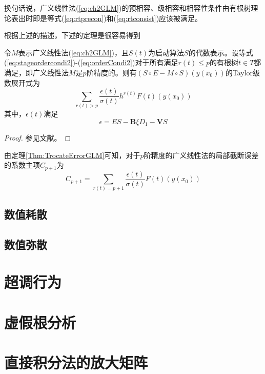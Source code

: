 换句话说，广义线性法(\ref{eq:ch2GLM})的预相容、级相容和相容性条件由有根树理论表出时即是等式(\ref{eq:rtprecon})和(\ref{eq:rtconsist})应该被满足。

根据上述的描述，下述的定理是很容易得到
\begin{theorem}\label{Thm:TrocateErrorGLM}
令$M$表示广义线性法(\ref{eq:ch2GLM})，且$S(t)$为启动算法$S$的代数表示。设等式(\ref{eq:stageordercondi2})-(\ref{eq:orderCondi2})对于所有满足$r(t)\le p$的有根树$t\in T$都满足，即广义线性法$M$是$p$阶精度的。则有$(S\circ E-M\circ S)(y(x_0))$的Taylor级数展开式为
\begin{equation}
\sum_{r(t)>p}\frac{\epsilon(t)}{\sigma(t)}h^{r(t)}F(t)(y(x_0))
\end{equation}
其中，$\epsilon(t)$满足
\begin{equation}
\epsilon= ES-\bm{B}\xi D_1-\bm{V}S
\end{equation}
\end{theorem}
\begin{proof}
参见文献。
\end{proof}

由定理\ref{Thm:TrocateErrorGLM}可知，对于$p$阶精度的广义线性法的局部截断误差的系数主项$C_{p+1}$为
\begin{equation}
C_{p+1}=\sum_{r(t)=p+1}\frac{\epsilon(t)}{\sigma(t)}F(t)(y(x_0))
\end{equation}



\subsection{数值耗散}

\subsection{数值弥散}

\section{超调行为}

\section{虚假根分析}

\section{直接积分法的放大矩阵}

